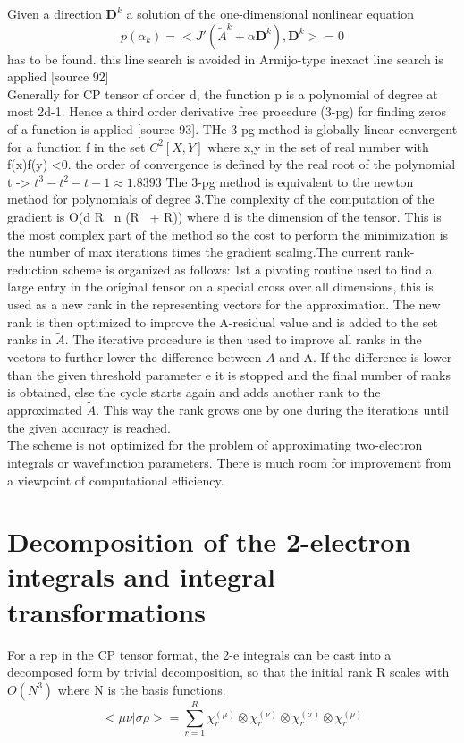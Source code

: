 \documentclass[10pt, draft]{article}
\begin{document}
Given a direction $\textbf{D}^k$ a solution of the one-dimensional nonlinear equation 
\[p(\alpha_k) = < J'(\tilde{A}^k + \alpha \textbf{D}^k) ,\textbf{D}^k >=0 \]
has to be found.  this line search is avoided in Armijo-type inexact line search is applied [source 92]\\
Generally for CP tensor of order d, the function p is a polynomial of degree at most 2d-1. Hence a third order derivative free procedure (3-pg) for finding zeros of a function is applied [source 93].  THe 3-pg method is globally linear convergent for a function f in the set $C^2[X,Y]$ where x,y in the set of real number with f(x)f(y) <0.  the order of convergence is defined by the real root of the polynomial t -> $t^3 -t^2 -t -1 \approx 1.8393$ The 3-pg method is equivalent to the newton method for polynomials of degree 3.\linebreak[1]
The complexity of the computation of the gradient is O(d R~ n (R~ + R)) where d is the dimension of the tensor.  This is the most complex part of the method so the cost to perform the minimization is the number of max iterations times the gradient scaling.\linebreak[1]
The current rank-reduction scheme is organized as follows: 1st a pivoting routine used to find a large entry in the original tensor on a special cross over all dimensions, this is used as a new rank in the representing vectors for the approximation.  The new rank is then optimized to improve the A-residual value and is added to the set ranks in $\tilde{A}$.  The iterative procedure is then used to improve all ranks in the vectors to further lower the difference between $\tilde{A}$ and A.  If the difference is lower than the given threshold parameter e it is stopped and the final number of ranks is obtained, else the cycle starts again and adds another rank to the approximated $\tilde{A}$.  This way the rank grows one by one during the iterations until the given accuracy is reached.\\
The scheme is not optimized for the problem of approximating two-electron integrals or wavefunction parameters.  There is much room for improvement from a viewpoint of computational efficiency.  


\section{Decomposition of the 2-electron integrals and integral transformations}
For a rep in the CP tensor format, the 2-e integrals can be cast into a decomposed form by trivial decomposition, so that the initial rank R scales with $O(N^3)$ where N is the basis functions.
\[ <\mu\nu|\sigma\rho> = \sum_{r=1}^R \chi_r^{(\mu)} \otimes \chi_r^{(\nu)} \otimes \chi_r^{(\sigma)} \otimes \chi_r^{(\rho)}\]
\end{document}
